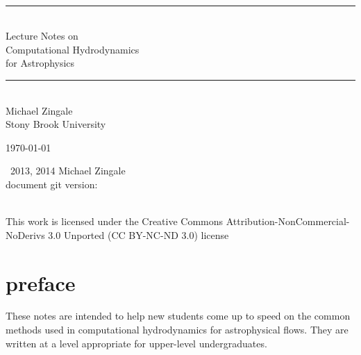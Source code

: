 \documentclass[11pt]{book}
\newcommand{\HRule}{\rule{\linewidth}{0.125mm}}
\renewcommand{\chaptermark}[1]{%
 \markboth{\chaptername
\ \thechapter.\ #1}{}}
\begin{document}
\frontmatter

\begin{titlepage}

\ \\[2.5in]
\begin{center}
\HRule\\[0.5em]
{\Huge \textsf{{
Lecture Notes on\\[0.1em]
Computational Hydrodynamics\\[0.3em]
for Astrophysics}}
}
\HRule
\\[2em]

{\Large \sf Michael Zingale} \\ {\sf Stony Brook University}
\end{center}

\vfill

\begin{flushright}
\today
\end{flushright}

\end{titlepage}

\null \vfill 

\noindent \ccCopy\ 2013, 2014 Michael Zingale \\
\noindent document git version: 

\noindent \ccbyncnd \\
\noindent This work is licensed under the Creative Commons
Attribution-NonCommercial-NoDerivs 3.0 Unported (CC BY-NC-ND 3.0)
license

\clearpage



\setcounter{tocdepth}{2}
\tableofcontents

\clearpage

\listoffigures
{}

\clearpage

\listofexercise
{}

\clearpage

\chapter*{preface}
\chaptermark{preface}


These notes are intended to help new students come up to speed on the
common methods used in computational hydrodynamics for astrophysical
flows.  They are written at a level appropriate for upper-level
undergraduates.
\end{document}
